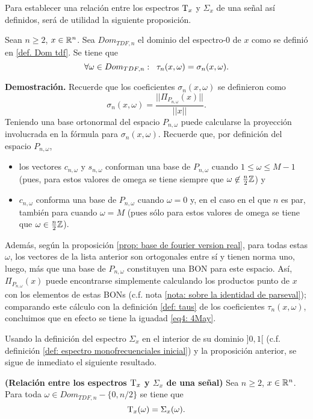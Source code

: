Para establecer una relación entre los espectros
$\mathrm{T}_{x}$ y $\Sigma_{x}$ de una señal así definidos,
será de utilidad la siguiente proposición.
\begin{prop}
\label{prop: coinciden espectr}
Sean $n \geq 2$, $x \in \mathbb{R}^{n}$.
Sea $Dom_{TDF, n}$ el dominio del espectro-0 de $x$
como se definió en \ref{def. Dom tdf}. Se tiene que
\begin{equation}
\label{eq4: 4May}
\forall \omega \in Dom_{TDF, n}:
\hspace{0.2cm} \tau_{n}(x, \omega) = \sigma_{n}(x, \omega).
\end{equation}
\end{prop}

\noindent
\textbf{Demostración.}
Recuerde que los coeficientes
$\sigma_{n}(x, \omega)$
se definieron como
\[
\sigma_{n}(x, \omega) = \frac{|| \Pi_{P_{n, \omega}}(x) ||}{|| x ||}.
\]
Teniendo una base ortonormal del espacio 
$P_{n, \omega}$ puede calcularse la proyección involucrada en la fórmula
para $\sigma_{n}(x, \omega)$.
Recuerde que, por definición del espacio $P_{n, \omega}$,
\begin{itemize}
	\item los vectores $c_{n, \omega}$ y $s_{n, \omega}$ conforman
	una base de $P_{n, \omega}$ cuando $1 \leq \omega \leq M-1$ 
	(pues, para estos valores de omega se tiene siempre
	que $\omega \not\in \frac{n}{2} \mathbb{Z}$) y
	\item $c_{n, \omega}$ conforma una base 
	de $P_{n, \omega}$ cuando $\omega = 0$ y,
	en el caso en el que $n$ es par, también para cuando $\omega = M$
	(pues sólo para estos valores de omega se tiene 
	que $\omega \in \frac{n}{2} \mathbb{Z}$).
\end{itemize}
Además, según la proposición
\ref{prop: base de fourier version real},
para todas estas $\omega$,
los vectores de la lista anterior son ortogonales entre
sí y tienen norma uno, luego, más que una base de 
$P_{n, \omega}$ constituyen una BON para este espacio.
Así, $\Pi_{P_{n, \omega}}(x)$ puede encontrarse 
simplemente calculando los productos punto 
de $x$ con los elementos de estas BONs (c.f. 
nota \ref{nota: sobre la identidad de parseval});
comparando este cálculo con la definición 
\ref{def: taus}
de los coeficientes $\tau_{n}(x, \omega)$,
concluimos que en efecto se
tiene la iguadad \eqref{eq4: 4May}.

\QEDB
\vspace{0.2cm}

Usando la definición del espectro
$\Sigma_{x}$ en el interior de su dominio
$]0,1[$ (c.f. definición
\ref{def: espectro monofrecuenciales inicial})
y la proposición anterior, se sigue
de inmediato el siguiente resultado.
\begin{cor}
\label{cor: relacion espectros}
\textbf{(Relación entre los espectros $\mathrm{T}_{x}$ y 
$\Sigma_{x}$ de una señal)}
Sea $n \geq 2$, $x \in \mathbb{R}^{n}$.
Para toda $\omega \in Dom_{TDF, n} - \{0, n/2 \}$
se tiene que
\[
\mathrm{T}_{x}(\omega) = \Sigma_{x}(\omega).
\]
\end{cor}

